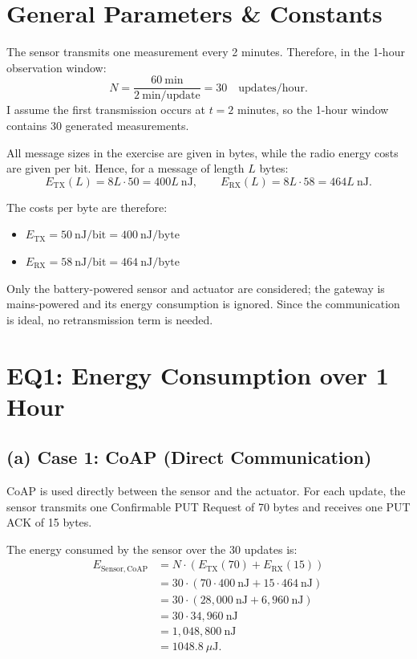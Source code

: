 \documentclass[a4paper,11pt]{article}
\title{\challengename}
\author{
  \authorname\\
  Person Code: \personcode
}
\date{\today}
\newcommand{\tx}{\mathrm{TX}}
\newcommand{\rx}{\mathrm{RX}}
\newcommand{\uJ}{\mu\mathrm{J}}
\begin{document}
\maketitle
\thispagestyle{empty}

\section*{General Parameters \& Constants}
The sensor transmits one measurement every 2 minutes. Therefore, in the
1-hour observation window:
\[
  N = \frac{60\ \mathrm{min}}{2\ \mathrm{min/update}} = 30
  \quad \text{updates/hour}.
\]
I assume the first transmission occurs at $t=2$ minutes, so the 1-hour window
contains 30 generated measurements.

All message sizes in the exercise are given in bytes, while the radio energy
costs are given per bit. Hence, for a message of length $L$ bytes:
\[
  E_{\tx}(L) = 8L \cdot 50 = 400L\ \mathrm{nJ},
  \qquad
  E_{\rx}(L) = 8L \cdot 58 = 464L\ \mathrm{nJ}.
\]

The costs per byte are therefore:
\begin{itemize}
    \item $E_{\tx} = 50\ \mathrm{nJ/bit} = 400\ \mathrm{nJ/byte}$
    \item $E_{\rx} = 58\ \mathrm{nJ/bit} = 464\ \mathrm{nJ/byte}$
\end{itemize}

Only the battery-powered sensor and actuator are considered; the gateway is
mains-powered and its energy consumption is ignored. Since the communication is
ideal, no retransmission term is needed.

\section*{EQ1: Energy Consumption over 1 Hour}

\subsection*{(a) Case 1: CoAP (Direct Communication)}
CoAP is used directly between the sensor and the actuator. For each update, the
sensor transmits one Confirmable PUT Request of 70 bytes and receives one PUT
ACK of 15 bytes.

The energy consumed by the sensor over the 30 updates is:
\[
\begin{aligned}
E_{\mathrm{Sensor,CoAP}}
  &= N \cdot \left(E_{\tx}(70) + E_{\rx}(15)\right) \\
  &= 30 \cdot (70 \cdot 400\ \mathrm{nJ} + 15 \cdot 464\ \mathrm{nJ}) \\
  &= 30 \cdot (28{,}000\ \mathrm{nJ} + 6{,}960\ \mathrm{nJ}) \\
  &= 30 \cdot 34{,}960\ \mathrm{nJ} \\
  &= 1{,}048{,}800\ \mathrm{nJ} \\
  &= 1048.8\ \uJ.
\end{aligned}
\]
\end{document}
